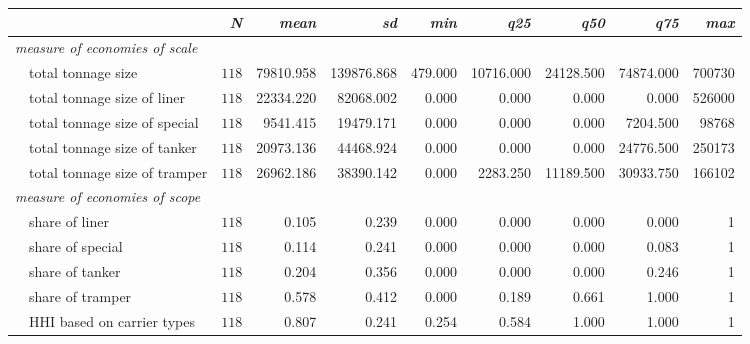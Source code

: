 \begin{tabular}{lrrrrrrrr}
\toprule
\multicolumn{1}{l}{\itshape }&\multicolumn{1}{r}{\itshape N}&\multicolumn{1}{r}{\itshape mean}&\multicolumn{1}{r}{\itshape sd}&\multicolumn{1}{r}{\itshape min}&\multicolumn{1}{r}{\itshape q25}&\multicolumn{1}{r}{\itshape q50}&\multicolumn{1}{r}{\itshape q75}&\multicolumn{1}{r}{\itshape max}\tabularnewline
\midrule
{\itshape measure of economies of scale}&&&&&&&&\tabularnewline
~~total tonnage size&$118$&79810.958&139876.868&479.000&10716.000&24128.500&74874.000&700730\tabularnewline
~~total tonnage size of liner&$118$&22334.220&82068.002&0.000&0.000&0.000&0.000&526000\tabularnewline
~~total tonnage size of special&$118$&9541.415&19479.171&0.000&0.000&0.000&7204.500&98768\tabularnewline
~~total tonnage size of tanker&$118$&20973.136&44468.924&0.000&0.000&0.000&24776.500&250173\tabularnewline
~~total tonnage size of tramper&$118$&26962.186&38390.142&0.000&2283.250&11189.500&30933.750&166102\tabularnewline
\midrule
{\itshape measure of economies of scope}&&&&&&&&\tabularnewline
~~share of liner&$118$&0.105&0.239&0.000&0.000&0.000&0.000&1\tabularnewline
~~share of special&$118$&0.114&0.241&0.000&0.000&0.000&0.083&1\tabularnewline
~~share of tanker&$118$&0.204&0.356&0.000&0.000&0.000&0.246&1\tabularnewline
~~share of tramper&$118$&0.578&0.412&0.000&0.189&0.661&1.000&1\tabularnewline
~~HHI based on carrier types&$118$&0.807&0.241&0.254&0.584&1.000&1.000&1\tabularnewline
\bottomrule
\end{tabular}
